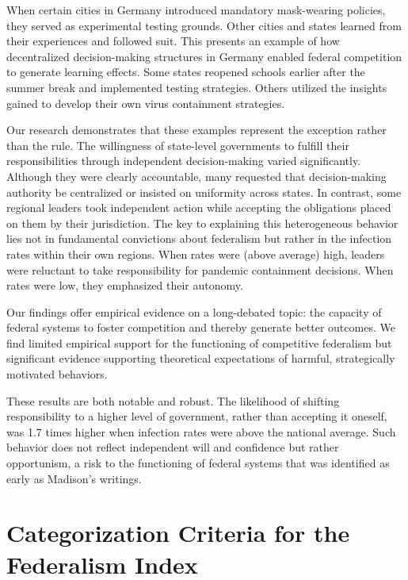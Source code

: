 \documentclass[authoryear,12pt, 3p]{elsarticle}
\theoremstyle{break}
\begin{document}
When certain cities in Germany introduced mandatory mask-wearing policies, they served as experimental testing grounds. Other cities and states learned from their experiences and followed suit. This presents an example of how decentralized decision-making structures in Germany enabled federal competition to generate learning effects. Some states reopened schools earlier after the summer break and implemented testing strategies. Others utilized the insights gained to develop their own virus containment strategies.

Our research demonstrates that these examples represent the exception rather than the rule. The willingness of state-level governments to fulfill their responsibilities through independent decision-making varied significantly. Although they were clearly accountable, many requested that decision-making authority be centralized or insisted on uniformity across states. In contrast, some regional leaders took independent action while accepting the obligations placed on them by their jurisdiction. The key to explaining this heterogeneous behavior lies not in fundamental convictions about federalism but rather in the infection rates within their own regions. When rates were (above average) high, leaders were reluctant to take responsibility for pandemic containment decisions. When rates were low, they emphasized their autonomy.

Our findings offer empirical evidence on a long-debated topic: the capacity of federal systems to foster competition and thereby generate better outcomes. We find limited empirical support for the functioning of competitive federalism but significant evidence supporting theoretical expectations of harmful, strategically motivated behaviors.

These results are both notable and robust. The likelihood of shifting responsibility to a higher level of government, rather than accepting it oneself, was 1.7 times higher when infection rates were above the national average. Such behavior does not reflect independent will and confidence but rather opportunism, a risk to the functioning of federal systems that was identified as early as Madison's writings.

\appendix

\section{Categorization Criteria for the Federalism Index}\label{app.category}

\end{document}
